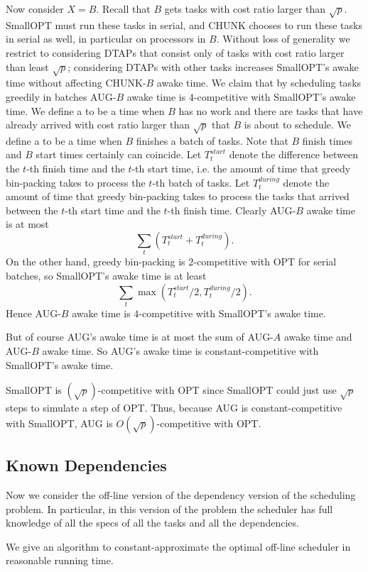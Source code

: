 Now consider $X=B$. Recall that $B$ gets tasks with cost ratio
larger than $\sqrt{p}$. SmallOPT must run these tasks in serial,
and CHUNK chooses to run these tasks in serial as well, in
particular on processors in $B$. Without loss of generality we
restrict to considering DTAPs that consist only of tasks with
cost ratio larger than least $\sqrt{p}$; considering DTAPs with
other tasks increases SmallOPT's awake time without affecting
CHUNK-$B$ awake time. We claim that by scheduling tasks greedily
in batches AUG-$B$ awake time is $4$-competitive with SmallOPT's
awake time. We define a  to be a time when
$B$ has no work and there are tasks that have already arrived
with cost ratio larger than $\sqrt{p}$ that $B$ is about to
schedule. We define a  to be a time when
$B$ finishes a batch of tasks. Note that $B$ finish times and $B$
start times certainly can coincide. Let $T_t^{start}$ denote the
difference between the $t$-th finish time and the $t$-th start
time, i.e. the amount of time that greedy bin-packing takes to
process the $t$-th batch of tasks. Let $T_t^{during}$ denote the
amount of time that greedy bin-packing takes to process the tasks
that arrived between the $t$-th start time and the $t$-th finish
time. Clearly AUG-$B$ awake time is at most 
$$\sum_{t} \left(T_t^{start} + T_t^{during}\right).$$
On the other hand, greedy bin-packing is $2$-competitive with OPT
for serial batches, so SmallOPT's awake time is at least 
$$\sum_{t} \max(T_t^{start}/2, T_t^{during}/2).$$
Hence AUG-$B$ awake time is $4$-competitive with SmallOPT's awake time.

But of course AUG's awake time is at most the sum of AUG-$A$
awake time and AUG-$B$ awake time. So AUG's awake time is
constant-competitive with SmallOPT's awake time.

SmallOPT is $(\sqrt{p})$-competitive with OPT since SmallOPT
could just use $\sqrt{p}$ steps to simulate a step of OPT. Thus,
because AUG is constant-competitive with SmallOPT, AUG is
$O(\sqrt{p})$-competitive with OPT. 

\subsection{Known Dependencies}
Now we consider the off-line version of the dependency version of
the scheduling problem. In particular, in this version of the
problem the scheduler has full knowledge of all the specs of all
the tasks and all the dependencies.

We give an algorithm to constant-approximate the optimal off-line
scheduler in reasonable running time.

